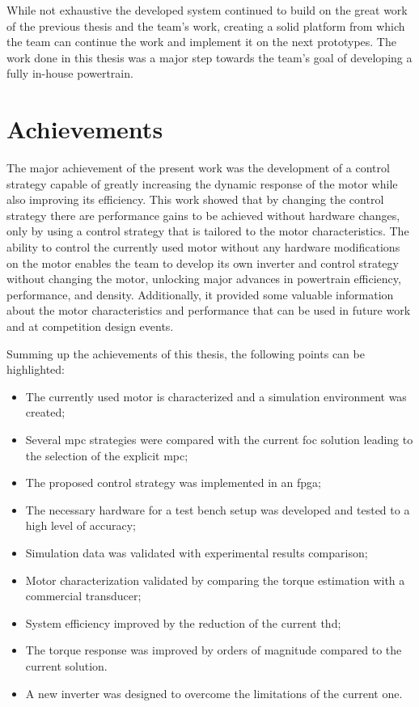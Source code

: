 While not exhaustive the developed system continued to build on the great work of the previous thesis and the team's work, creating a solid platform from which the team can continue the work and implement it on the next prototypes. The work done in this thesis was a major step towards the team's goal of developing a fully in-house powertrain.
\section{Achievements}
\label{section:achievements}

The major achievement of the present work was the development of a control strategy capable of greatly increasing the dynamic response of the motor while also improving its efficiency. This work showed that by changing the control strategy there are performance gains to be achieved without hardware changes, only by using a control strategy that is tailored to the motor characteristics. The ability to control the currently used motor without any hardware modifications on the motor enables the team to develop its own inverter and control strategy without changing the motor, unlocking major advances in powertrain efficiency, performance, and density. Additionally, it provided some valuable information about the motor characteristics and performance that can be used in future work and at competition design events.

Summing up the achievements of this thesis, the following points can be highlighted:
\begin{itemize}
    \item The currently used motor is characterized and a simulation environment was created;
    \item Several \gls{mpc} strategies were compared with the current \gls{foc} solution leading to the selection of the explicit \gls{mpc};
    \item The proposed control strategy was implemented in an \gls{fpga};
    \item The necessary hardware for a test bench setup was developed and tested to a high level of accuracy;
    \item Simulation data was validated with experimental results comparison;
    \item Motor characterization validated by comparing the torque estimation with a commercial transducer;
    \item System efficiency improved by the reduction of the current \gls{thd};
    \item The torque response was improved by orders of magnitude compared to the current solution.
    \item A new inverter was designed to overcome the limitations of the current one.
\end{itemize}


